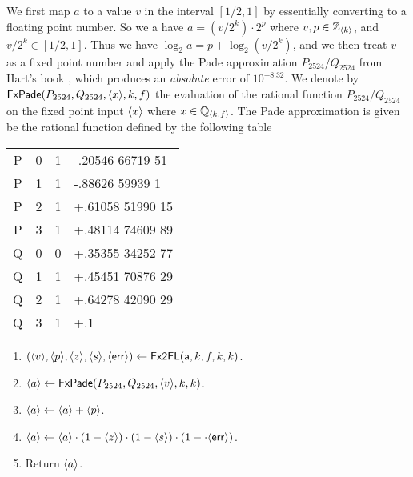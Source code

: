 We first map $a$ to a value $v$ in the interval $[1/2,1]$ by essentially
converting to a floating point number.
So we a have $a=(v/2^k) \cdot 2^p$ where $v, p \in {\mathbb{Z}}_{\langle k \rangle}$,
and $v/2^k \in [1/2,1]$.
Thus we have
$\log_2 a = p+\log_2 (v/2^k)$, and we then treat $v$ as a fixed
point number and apply the Pade approximation $P_{2524}/Q_{2524}$
from Hart's book \cite{Hart:1978:CA:540084},
which produces an {\em absolute} error of $10^{-8.32}$.
We denote by $\mathsf{FxPade}(P_{2524},Q_{2524},\langle x \rangle,k,f)$ the evaluation
of the rational function $P_{2524}/Q_{2524}$ on the fixed point input $\langle x \rangle$
where $x \in {\mathbb{Q}}_{\langle k, f \rangle}$.
The Pade approximation is given be the rational function defined
by the following table
\begin{center}
  \begin{tabular}{|c|c|c|l|}
    \hline
    P & 0 & 1 & -.20546 66719 51 \\
    P & 1 & 1 & -.88626 59939 1  \\
    P & 2 & 1 & +.61058 51990 15 \\
    P & 3 & 1 & +.48114 74609 89 \\
    Q & 0 & 0 & +.35355 34252 77 \\
    Q & 1 & 1 & +.45451 70876 29 \\
    Q & 2 & 1 & +.64278 42090 29 \\
    Q & 3 & 1 & +.1              \\
    \hline
  \end{tabular}
\end{center}

\begin{enumerate}
  \item $(\langle v \rangle,\langle p \rangle,\langle z \rangle,\langle s \rangle,\langle \mathsf{err} \rangle)
          \leftarrow \mathsf{Fx2FL}(\mathsf{a},k,f,k,k)$.
  \item $\langle a \rangle \leftarrow \mathsf{FxPade}(P_{2524},Q_{2524},\langle v \rangle,k,k)$.
  \item $\langle a \rangle \leftarrow \langle a \rangle+\langle p \rangle$.
  \item $\langle a \rangle \leftarrow \langle a \rangle \cdot (1-\langle z \rangle) \cdot (1-\langle s \rangle) \cdot (1-\cdot \langle \mathsf{err} \rangle)$.
  \item Return $\langle a \rangle$.
\end{enumerate}

